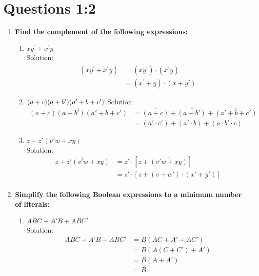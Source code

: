 \documentclass[a4paper,12pt]{article}
\newcommand{\p}{^\prime}
\begin{document}
\section*{\LARGE Questions 1:2}
\begin{enumerate}[label=\textbf{\arabic* .}]
\item \textbf{Find the complement of the following expressions:}
    \begin{enumerate}[label=\alph* .]
    \item $xy^\prime +x^\prime y$\\[0.3cm]
    {\color{blue} Solution:
    \begin{align*}
    \overline{(xy^\prime +x^\prime y)} &= \overline{(xy^\prime)} \cdot  \overline{(x^\prime y)}\\
    &= (x\p + y) \cdot (x +y')
    \end{align*}}
    \item $(a + c)(a + {b}')({a}' + b + {c}')\\[0.3cm]$
    {\color{blue} Solution:
    \begin{align*}
    \overline{(a + c)(a + {b}')({a}' + b + {c}')} &= \overline{(a+c)}+ \overline{(a+{b}')}+  \overline{({a}' + b + {c}')}\\
    &= (a' \cdot c') +(a' \cdot b)+(a \cdot b' \cdot c)
    \end{align*}}
    \item $z + {z}'({v}'w + xy)$\\[0.3cm]
    {\color{blue} Solution:
    \begin{align*}
    \overline{z + {z}'({v}'w + xy)} &= z' \cdot [z+\overline{({v}'w + xy)}]\\
    &= z' \cdot [z+(v+w')\cdot(x'+y')]\\
    \end{align*}}
    \end{enumerate}
    \item \textbf{Simplify the following Boolean expressions to a minimum number of literals:}
      \begin{enumerate}[label=\alph* .]
    \item $ABC +A'B+ABC'$\\[0.3cm]
        {\color{blue} Solution:
        \begin{align*}
        ABC +A'B+ABC' &= B(AC +A' +AC')\\
        &= B(A(C+C')+A')\\
        &= B(A+A')\\
        &= B
        \end{align*}}

\end{enumerate}
\end{enumerate}
\end{document}

